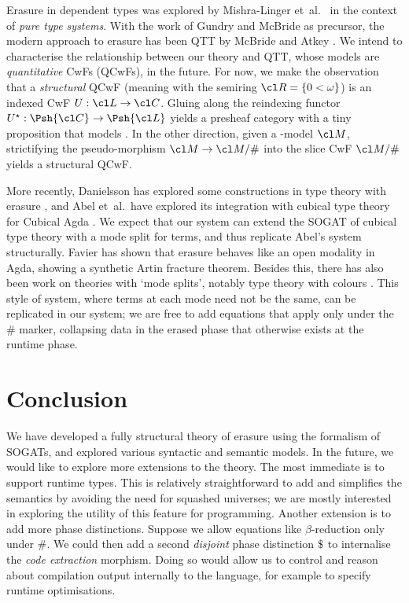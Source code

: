 \documentclass[a4paper,UKenglish,cleveref,autoref,thm-restate]{lipics-v2021}
\begin{document}
Erasure in dependent types was explored by Mishra-Linger
et~al.~\cite{Mishra-Linger2008-zy} in the context of \emph{pure type systems}.
With the work of Gundry and McBride \cite{Gundry2013-px} as precursor, the
modern approach to erasure has been QTT by McBride \cite{McBride2016-oa} and
Atkey \cite{Atkey2018-pj}. We intend to characterise the relationship between
our theory and QTT, whose models are \emph{quantitative} CwFs (QCwFs), in the
future. For now, we make the observation that a \emph{structural} QCwF (meaning
with the semiring $\cl R = \{0 < \omega\}$) is an indexed CwF $U : \cl L \to \cl
C$. Gluing along the reindexing functor $U^\star : \Psh{\cl C} \to \Psh{\cl
L}$ yields a presheaf category with a tiny proposition that models \ZTT. In the
other direction, given a \ZTT-model $\cl M$, strictifying the pseudo-morphism
$\cl M \to \cl M / \#$ into the slice CwF $\cl M / \#$ yields a
structural QCwF.

More recently, Danielsson has explored some constructions in type theory with
erasure \cite{Danielsson_undated-pj}, and Abel et~al.~have explored its
integration with cubical type theory for Cubical Agda \cite{AbelUnknown-od}. We
expect that our system can extend the SOGAT of cubical type theory
\cite[4.6.3]{Uemura2021-jq} with a mode split for terms, and thus replicate
Abel's system structurally. Favier \cite{FavierUnknown-wx} has shown that
erasure behaves like an open modality in Agda, showing a synthetic Artin
fracture theorem. Besides this, there has also been work on theories with `mode
splits', notably type theory with colours \cite{Jean-Philippe2013-js}. This
style of system, where terms at each mode need not be the same, can be
replicated in our system; we are free to add equations that apply only under the
$\#$ marker, collapsing data in the erased phase that otherwise exists at the
runtime phase. 

\section{Conclusion}\label{sec:concl}

We have developed a fully structural theory of erasure using the formalism of
SOGATs, and explored various syntactic and semantic models.  
In the future, we would like to explore more extensions to the theory. The most
immediate is to support runtime types. This is relatively straightforward to add
and simplifies the semantics by avoiding the need for squashed universes; we are
mostly interested in exploring the utility of this feature for programming.
Another extension is to add more phase distinctions. Suppose we allow equations
like $\beta$-reduction only under $\#$. We could then add a second
\emph{disjoint} phase distinction $\text{\textdollar}$ to internalise the \emph{code
extraction} morphism. Doing so would allow us to control and reason about
compilation output internally to the language, for example to specify runtime
optimisations.


\end{document}
